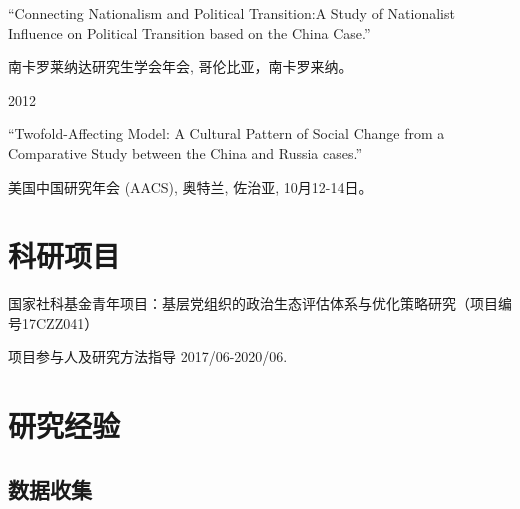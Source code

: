 \documentclass[10.5pt,]{article}
\providecommand{\tightlist}{%
	\setlength{\itemsep}{0pt}\setlength{\parskip}{0pt}}
\renewenvironment{itemize}{
	\begin{list}{}{
			\setlength{\leftmargin}{1.5em}
		}
	}{
	\end{list}
}
\begin{document}
\begin{itemize}
  \begin{itemize}
  \tightlist
  \item
    ``Connecting Nationalism and Political Transition:A Study of
    Nationalist Influence on Political Transition based on the China
    Case.''

    \begin{itemize}
    \tightlist
    \item
      \footnotesize 南卡罗莱纳达研究生学会年会, 哥伦比亚，南卡罗来纳。
    \end{itemize}
  \end{itemize}
\item
  2012

  \begin{itemize}
  \tightlist
  \item
    ``Twofold-Affecting Model: A Cultural Pattern of Social Change from
    a Comparative Study between the China and Russia cases.''

    \begin{itemize}
    \tightlist
    \item
      \footnotesize 美国中国研究年会 (AACS), 奥特兰, 佐治亚,
      10月12-14日。
    \end{itemize}
  \end{itemize}
\end{itemize}

\section{科研项目}

\begin{itemize}
\tightlist
\item
  国家社科基金青年项目：基层党组织的政治生态评估体系与优化策略研究（项目编号17CZZ041）

  \begin{itemize}
  \tightlist
  \item
    项目参与人及研究方法指导 \hfill 2017/06-2020/06.
  \end{itemize}
\end{itemize}

\section{研究经验}

\subsection{数据收集}
\end{document}

